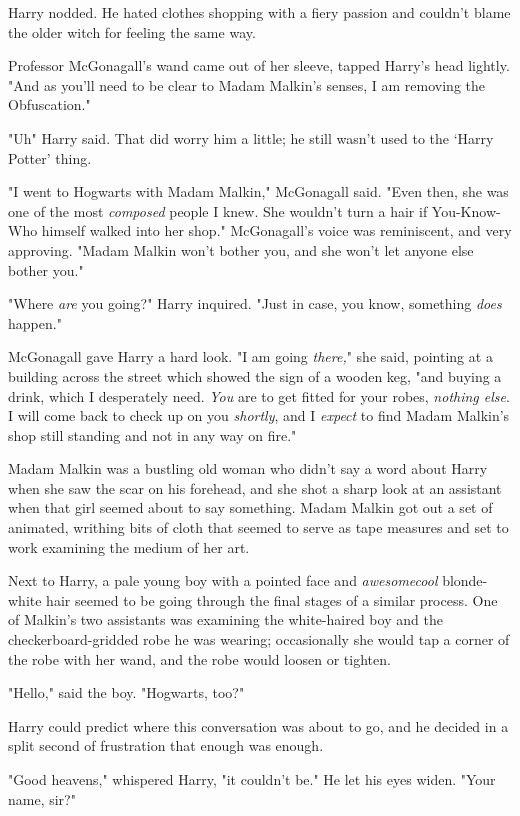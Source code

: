 Harry nodded. He hated clothes shopping with a fiery passion and couldn't blame
the older witch for feeling the same way.

Professor McGonagall's wand came out of her sleeve, tapped Harry's head
lightly. "And as you'll need to be clear to Madam Malkin's senses, I am
removing the Obfuscation."

"Uh{\el}" Harry said. That did worry him a little; he still wasn't used to
the `Harry Potter' thing.

"I went to Hogwarts with Madam Malkin," McGonagall said. "Even then, she was
one of the most \emph{composed} people I knew. She wouldn't turn a hair if
You-Know-Who himself walked into her shop." McGonagall's voice was reminiscent,
and very approving. "Madam Malkin won't bother you, and she won't let anyone
else bother you."

"Where \emph{are} you going?" Harry inquired. "Just in case, you know,
something \emph{does} happen."

McGonagall gave Harry a hard look. "I am going \emph{there,}" she said,
pointing at a building across the street which showed the sign of a wooden keg,
"and buying a drink, which I desperately need. \emph{You} are to get fitted for
your robes, \emph{nothing else}. I will come back to check up on you
\emph{shortly}, and I \emph{expect} to find Madam Malkin's shop still standing
and not in any way on fire."

Madam Malkin was a bustling old woman who didn't say a word about Harry when
she saw the scar on his forehead, and she shot a sharp look at an assistant
when that girl seemed about to say something. Madam Malkin got out a set of
animated, writhing bits of cloth that seemed to serve as tape measures and set
to work examining the medium of her art.

Next to Harry, a pale young boy with a pointed face and \emph{awesomecool}
blonde-white hair seemed to be going through the final stages of a similar
process. One of Malkin's two assistants was examining the white-haired boy and
the checkerboard-gridded robe he was wearing; occasionally she would tap a
corner of the robe with her wand, and the robe would loosen or tighten.

"Hello," said the boy. "Hogwarts, too?"

Harry could predict where this conversation was about to go, and he decided in
a split second of frustration that enough was enough.

"Good heavens," whispered Harry, "it couldn't be." He let his eyes widen.
"Your{\el} name, sir?"

